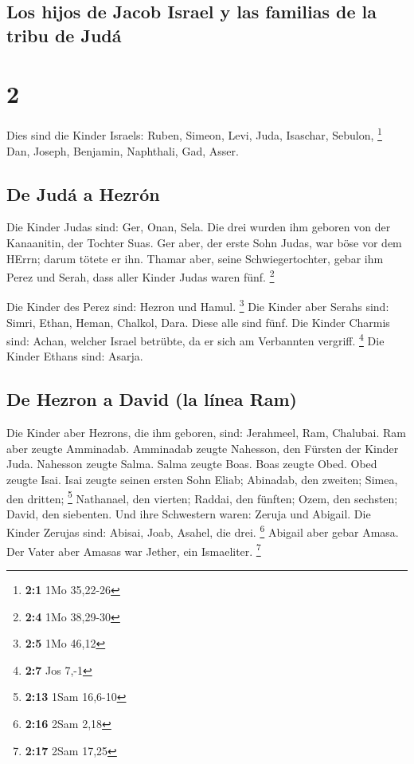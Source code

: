 \hypertarget{los-hijos-de-jacob-israel-y-las-familias-de-la-tribu-de-juduxe1}{%
\subsection{Los hijos de Jacob Israel y las familias de la tribu de
Judá}\label{los-hijos-de-jacob-israel-y-las-familias-de-la-tribu-de-juduxe1}}

\hypertarget{section-1}{%
\section{2}\label{section-1}}

 Dies sind die Kinder Israels: Ruben, Simeon, Levi, Juda,
Isaschar, Sebulon, \footnote{\textbf{2:1} 1Mo 35,22-26} 
Dan, Joseph, Benjamin, Naphthali, Gad, Asser.

\hypertarget{de-juduxe1-a-hezruxf3n}{%
\subsection{De Judá a Hezrón}\label{de-juduxe1-a-hezruxf3n}}

 Die Kinder Judas sind: Ger, Onan, Sela. Die drei wurden
ihm geboren von der Kanaanitin, der Tochter Suas. Ger aber, der erste
Sohn Judas, war böse vor dem HErrn; darum tötete er ihn. 
Thamar aber, seine Schwiegertochter, gebar ihm Perez und Serah, dass
aller Kinder Judas waren fünf. \footnote{\textbf{2:4} 1Mo 38,29-30}

 Die Kinder des Perez sind: Hezron und Hamul. \footnote{\textbf{2:5}
  1Mo 46,12}  Die Kinder aber Serahs sind: Simri, Ethan,
Heman, Chalkol, Dara. Diese alle sind fünf.  Die Kinder
Charmis sind: Achan, welcher Israel betrübte, da er sich am Verbannten
vergriff. \footnote{\textbf{2:7} Jos 7,-1}  Die Kinder
Ethans sind: Asarja.

\hypertarget{de-hezron-a-david-la-luxednea-ram}{%
\subsection{De Hezron a David (la línea
Ram)}\label{de-hezron-a-david-la-luxednea-ram}}

 Die Kinder aber Hezrons, die ihm geboren, sind:
Jerahmeel, Ram, Chalubai.  Ram aber zeugte Amminadab.
Amminadab zeugte Nahesson, den Fürsten der Kinder Juda. 
Nahesson zeugte Salma. Salma zeugte Boas.  Boas zeugte
Obed. Obed zeugte Isai.  Isai zeugte seinen ersten Sohn
Eliab; Abinadab, den zweiten; Simea, den dritten; \footnote{\textbf{2:13}
  1Sam 16,6-10}  Nathanael, den vierten; Raddai, den
fünften;  Ozem, den sechsten; David, den siebenten.
 Und ihre Schwestern waren: Zeruja und Abigail. Die
Kinder Zerujas sind: Abisai, Joab, Asahel, die drei. \footnote{\textbf{2:16}
  2Sam 2,18}  Abigail aber gebar Amasa. Der Vater aber
Amasas war Jether, ein Ismaeliter. \footnote{\textbf{2:17} 2Sam 17,25}

